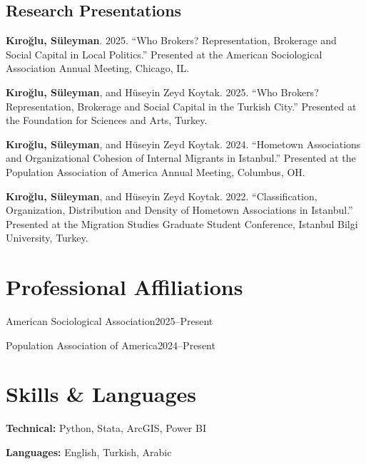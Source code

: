 \documentclass[11pt,letterpaper]{article}
\newcommand{\dated}[2]{#1\hfill{\sffamily\small\color{muted}#2}\par\smallskip}
\newcommand{\me}[1]{\textbf{#1}}
\begin{document}
\subsection{Research Presentations}
\begin{cites}
  \item \me{Kıroğlu, Süleyman}. 2025. ``Who Brokers? Representation, Brokerage and Social
    Capital in Local Politics.'' Presented at the American Sociological Association
    Annual Meeting, Chicago, IL.
  \item \me{Kıroğlu, Süleyman}, and Hüseyin Zeyd Koytak. 2025. ``Who Brokers?
    Representation, Brokerage and Social Capital in the Turkish City.'' Presented at the
    Foundation for Sciences and Arts, Turkey.
  \item \me{Kıroğlu, Süleyman}, and Hüseyin Zeyd Koytak. 2024. ``Hometown Associations and
    Organizational Cohesion of Internal Migrants in Istanbul.'' Presented at the Population
    Association of America Annual Meeting, Columbus, OH.
  \item \me{Kıroğlu, Süleyman}, and Hüseyin Zeyd Koytak. 2022. ``Classification,
    Organization, Distribution and Density of Hometown Associations in Istanbul.''
    Presented at the Migration Studies Graduate Student Conference, Istanbul Bilgi
    University, Turkey.
\end{cites}

\section{Professional Affiliations}
\dated{American Sociological Association}{2025--Present}
\dated{Population Association of America}{2024--Present}

\section{Skills \& Languages}
\textbf{Technical:} Python, Stata, ArcGIS, Power BI\par
\smallskip
\textbf{Languages:} English, Turkish, Arabic
\end{document}
